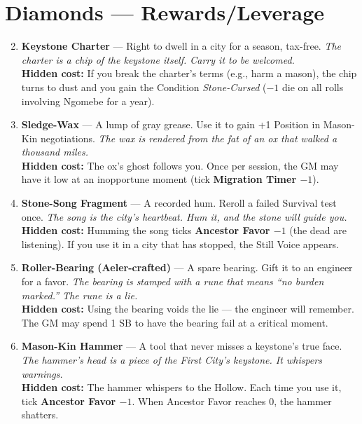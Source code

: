 \section*{Diamonds --- Rewards/Leverage}
\label{sec:ngomebe-rewards}
\begin{enumerate}
\setcounter{enumi}{1}
\item \textbf{Keystone Charter} --- Right to dwell in a city for a season, tax-free.
  \hfill \textit{The charter is a chip of the keystone itself. Carry it to be welcomed.} \\
  \textbf{Hidden cost:} If you break the charter's terms (e.g., harm a mason), the chip turns to dust and you gain the Condition \textit{Stone-Cursed} ($-1$ die on all rolls involving Ngomebe for a year).

\item \textbf{Sledge-Wax} --- A lump of gray grease. Use it to gain +1 Position in Mason-Kin negotiations.
  \hfill \textit{The wax is rendered from the fat of an ox that walked a thousand miles.} \\
  \textbf{Hidden cost:} The ox's ghost follows you. Once per session, the GM may have it low at an inopportune moment (tick \textbf{Migration Timer $-1$}).

\item \textbf{Stone-Song Fragment} --- A recorded hum. Reroll a failed Survival test once.
  \hfill \textit{The song is the city's heartbeat. Hum it, and the stone will guide you.} \\
  \textbf{Hidden cost:} Humming the song ticks \textbf{Ancestor Favor $-1$} (the dead are listening). If you use it in a city that has stopped, the Still Voice appears.

\item \textbf{Roller-Bearing (Aeler-crafted)} --- A spare bearing. Gift it to an engineer for a favor.
  \hfill \textit{The bearing is stamped with a rune that means ``no burden marked.'' The rune is a lie.} \\
  \textbf{Hidden cost:} Using the bearing voids the lie --- the engineer will remember. The GM may spend 1 SB to have the bearing fail at a critical moment.

\item \textbf{Mason-Kin Hammer} --- A tool that never misses a keystone's true face.
  \hfill \textit{The hammer's head is a piece of the First City's keystone. It whispers warnings.} \\
  \textbf{Hidden cost:} The hammer whispers to the Hollow. Each time you use it, tick \textbf{Ancestor Favor $-1$}. When Ancestor Favor reaches 0, the hammer shatters.


\end{enumerate}

